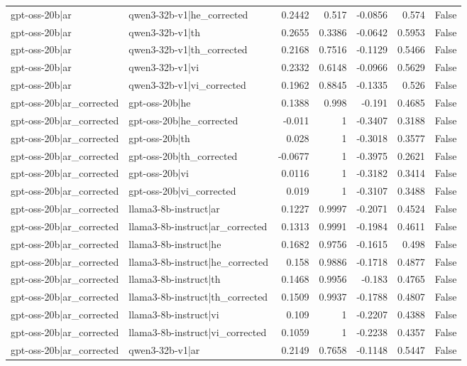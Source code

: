 \begin{table}
\begin{tabular}{l l r r r r l}
gpt-oss-20b|ar & qwen3-32b-v1|he_corrected & 0.2442 & 0.517 & -0.0856 & 0.574 & False \\
gpt-oss-20b|ar & qwen3-32b-v1|th & 0.2655 & 0.3386 & -0.0642 & 0.5953 & False \\
gpt-oss-20b|ar & qwen3-32b-v1|th_corrected & 0.2168 & 0.7516 & -0.1129 & 0.5466 & False \\
gpt-oss-20b|ar & qwen3-32b-v1|vi & 0.2332 & 0.6148 & -0.0966 & 0.5629 & False \\
gpt-oss-20b|ar & qwen3-32b-v1|vi_corrected & 0.1962 & 0.8845 & -0.1335 & 0.526 & False \\
gpt-oss-20b|ar_corrected & gpt-oss-20b|he & 0.1388 & 0.998 & -0.191 & 0.4685 & False \\
gpt-oss-20b|ar_corrected & gpt-oss-20b|he_corrected & -0.011 & 1 & -0.3407 & 0.3188 & False \\
gpt-oss-20b|ar_corrected & gpt-oss-20b|th & 0.028 & 1 & -0.3018 & 0.3577 & False \\
gpt-oss-20b|ar_corrected & gpt-oss-20b|th_corrected & -0.0677 & 1 & -0.3975 & 0.2621 & False \\
gpt-oss-20b|ar_corrected & gpt-oss-20b|vi & 0.0116 & 1 & -0.3182 & 0.3414 & False \\
gpt-oss-20b|ar_corrected & gpt-oss-20b|vi_corrected & 0.019 & 1 & -0.3107 & 0.3488 & False \\
gpt-oss-20b|ar_corrected & llama3-8b-instruct|ar & 0.1227 & 0.9997 & -0.2071 & 0.4524 & False \\
gpt-oss-20b|ar_corrected & llama3-8b-instruct|ar_corrected & 0.1313 & 0.9991 & -0.1984 & 0.4611 & False \\
gpt-oss-20b|ar_corrected & llama3-8b-instruct|he & 0.1682 & 0.9756 & -0.1615 & 0.498 & False \\
gpt-oss-20b|ar_corrected & llama3-8b-instruct|he_corrected & 0.158 & 0.9886 & -0.1718 & 0.4877 & False \\
gpt-oss-20b|ar_corrected & llama3-8b-instruct|th & 0.1468 & 0.9956 & -0.183 & 0.4765 & False \\
gpt-oss-20b|ar_corrected & llama3-8b-instruct|th_corrected & 0.1509 & 0.9937 & -0.1788 & 0.4807 & False \\
gpt-oss-20b|ar_corrected & llama3-8b-instruct|vi & 0.109 & 1 & -0.2207 & 0.4388 & False \\
gpt-oss-20b|ar_corrected & llama3-8b-instruct|vi_corrected & 0.1059 & 1 & -0.2238 & 0.4357 & False \\
gpt-oss-20b|ar_corrected & qwen3-32b-v1|ar & 0.2149 & 0.7658 & -0.1148 & 0.5447 & False \\

\end{tabular}
\end{table}
